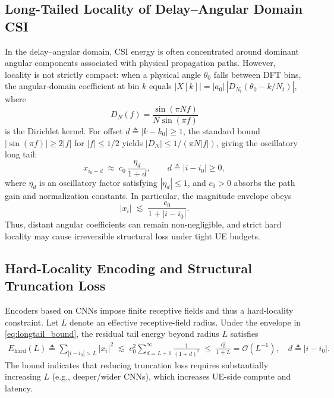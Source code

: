 \documentclass[conference]{IEEEtran}
\begin{document}
\subsection{Long-Tailed Locality of Delay--Angular Domain CSI}
\label{subsec:longtail}
In the delay--angular domain, CSI energy is often concentrated around dominant angular components associated with physical propagation paths. However, locality is not strictly compact: when a physical angle $\theta_0$ falls between DFT bins, the angular-domain coefficient at bin $k$ equals $|X[k]|=|a_0|\,|D_{N_t}(\theta_0-k/N_t)|$, where
\begin{equation}
D_N(f)=\frac{\sin(\pi N f)}{N\sin(\pi f)}
\label{eq:dirichlet_kernel}
\end{equation}
is the Dirichlet kernel. For offset $d\triangleq|k-k_0|\ge 1$, the standard bound $|\sin(\pi f)|\ge 2|f|$ for $|f|\le 1/2$ yields $|D_N|\le 1/(\pi N|f|)$, giving the oscillatory long tail:
\begin{equation}
x_{i_0+d} \;\approx\; c_0\,\frac{\eta_d}{1+d},
\qquad
d \triangleq |i-i_0|\ge 0,
\label{eq:dirichlet_osc_tail}
\end{equation}
where $\eta_d$ is an oscillatory factor satisfying $|\eta_d|\le 1$, and $c_0>0$ absorbs the path gain and normalization constants. In particular, the magnitude envelope obeys
\begin{equation}
|x_i|
\;\lesssim\;
\frac{c_0}{1+|i-i_0|}.
\label{eq:longtail_bound}
\end{equation}
Thus, distant angular coefficients can remain non-negligible, and strict hard locality may cause irreversible structural loss under tight UE budgets.

\subsection{Hard-Locality Encoding and Structural Truncation Loss}
\label{subsec:hard_locality}
Encoders based on CNNs impose finite receptive fields and thus a hard-locality constraint. Let $L$ denote an effective receptive-field radius. Under the envelope in \eqref{eq:longtail_bound}, the residual tail energy beyond radius $L$ satisfies
\begin{align}
E_{\mathrm{hard}}(L)
\triangleq
\sum_{|i-i_0|>L} |x_i|^2
\;\lesssim\;
c_0^2\sum_{d=L+1}^{\infty}\frac{1}{(1+d)^2}
\;\le\;
\frac{c_0^2}{1+L}
=
\mathcal{O}\!\left(L^{-1}\right),
\quad d \triangleq |i-i_0|.
\label{eq:hard_tail}
\end{align}
The bound indicates that reducing truncation loss requires substantially increasing $L$ (e.g., deeper/wider CNNs), which increases UE-side compute and latency.
\end{document}
